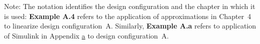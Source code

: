 Note: The notation identifies the design configuration and the chapter
in which it is used: {\bf Example A.4} refers to the application of
approximations in Chapter~4 to linearize design
configuration~A\@. Similarly, {\bf Example A.a} refers to application
of Simulink in Appendix \underline{a} to design configuration~A.

